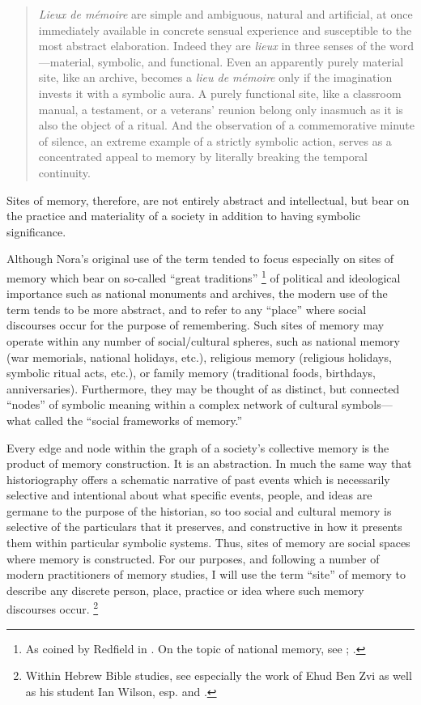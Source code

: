 \begin{quote}
    \emph{Lieux de mémoire} are simple and ambiguous, natural and artificial, at once immediately available in concrete sensual experience and susceptible to the most abstract elaboration. Indeed they are \emph{lieux} in three senses of the word---material, symbolic, and functional. Even an apparently purely material site, like an archive, becomes a \emph{lieu de mémoire} only if the imagination invests it with a symbolic aura. A purely functional site, like a classroom manual, a testament, or a veterans' reunion belong only inasmuch as it is also the object of a ritual. And the observation of a commemorative minute of silence, an extreme example of a strictly symbolic action, serves as a concentrated appeal to memory by literally breaking the temporal continuity.%
        \autocite[18--19]{nora_representations1989}
\end{quote}

\noindent
Sites of memory, therefore, are not entirely abstract and intellectual, but bear on the practice and materiality of a society in addition to having symbolic significance.

Although Nora's original use of the term tended to focus especially on sites of memory which bear on so-called ``great traditions''%
    \footnote{%
        As coined by Redfield in 
        \cite*[41--42]{redfield1956}.
        On the topic of national memory, see
        \cite{carretero-alphen_wagoner2017};
        \cite{wertsch_wagoner2017}.}
of political and ideological importance such as national monuments and archives, the modern use of the term tends to be more abstract, and to refer to any ``place'' where social discourses occur for the purpose of remembering. Such sites of memory may operate within any number of social/cultural spheres, such as national memory (war memorials, national holidays, etc.), religious memory (religious holidays, symbolic ritual acts, etc.), or family memory (traditional foods, birthdays, anniversaries). Furthermore, they may be thought of as distinct, but connected ``nodes'' of symbolic meaning within a complex network of cultural symbols---what \halbwachs called the ``social frameworks of memory.''%
    \autocite[38]{halbwachs1992}  

Every edge and node within the graph of a society's collective memory is the product of memory construction. It is an abstraction. In much the same way that historiography offers a schematic narrative of past events which is necessarily selective and intentional about what specific events, people, and ideas are germane to the purpose of the historian, so too social and cultural memory is selective of the particulars that it preserves, and constructive in how it presents them within particular symbolic systems. Thus, sites of memory are social spaces where memory is constructed. For our purposes, and following a number of modern practitioners of memory studies, I will use the term ``site'' of memory to describe any discrete person, place, practice or idea where such memory discourses occur.%
    \footnote{%
        Within Hebrew Bible studies, see especially the work of Ehud Ben Zvi as well as his student Ian Wilson, esp.
        \cite[72--74]{benzvi_st2017} and 
        \cite[25--26]{wilson2017}.}

